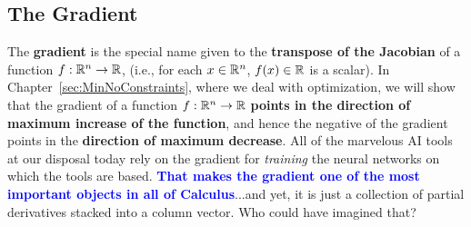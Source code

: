  
 \subsection{The Gradient}
 
 The \textbf{gradient} is the special name given to the \textbf{transpose of the Jacobian} of a function $f:\mathbb R^{n} \to \mathbb R$, (i.e., for each $x \in \mathbb R^{n}$, $f(x)\in \mathbb R$ is a scalar). In Chapter~\ref{sec:MinNoConstraints}, where we deal with optimization, we will show that the gradient of a function  $f:\mathbb R^{n} \to \mathbb R$ \textbf{points in the direction of maximum increase of the function}, and hence the negative of the gradient points in the \textbf{direction of maximum decrease}. All of the marvelous AI tools at our disposal today rely on the gradient for \textit{training} the neural networks on which the tools are based. \textcolor{blue}{\bf That makes the gradient one of the most important objects in all of Calculus}...and yet, it is just a collection of partial derivatives stacked into a column vector. Who could have imagined that? \\
 
